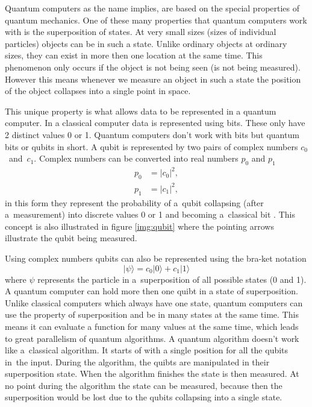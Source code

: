 Quantum computers as the name implies, are based on the special properties of quantum mechanics. One of these many properties that quantum computers work with is the superposition of states. At very small sizes (sizes of individual particles) objects can be in such a state. Unlike ordinary objects at ordinary sizes, they can exist in more then one location at the same time. This phenomenon only occurs if the object is not being seen (is not being measured). However this means whenever we measure an object in such a state the position of the object collapses into a single point in space. \cite{Yanofsky2008}


This unique property is what allows data to be represented in a quantum computer. In a classical computer data is represented using bits. These only have 2 distinct values 0 or 1. Quantum computers don't work with bits but quantum bits or qubits in short. A qubit is represented by two pairs of complex numbers $c_0$~and~$c_1$. Complex numbers can be converted into real numbers $p_0$ and $p_1$
\begin{equation}
  \begin{aligned}
    p_0 &= \lvert c_0 \rvert^2, \\
    p_1 &= \lvert c_1 \rvert^2,
  \end{aligned}  
\end{equation}
in this form they represent the probability of a~qubit collapsing (after a~measurement) into discrete values 0 or 1 and becoming a~classical bit \cite{Yanofsky2008}. This concept is also illustrated in figure \ref{img:qubit} where the pointing arrows illustrate the qubit being measured.

Using complex numbers qubits can also be represented using the bra-ket notation
\begin{equation}
  \lvert\psi\rangle=c_0|0\rangle + c_1|1\rangle
\end{equation}
where $\psi$ represents the particle in a~superposition of all possible states (0 and 1). A quantum computer can hold more then one quibt in a state of superposition. Unlike classical computers which always have one state, quantum computers can use the property of superposition and be in many states at the same time. This means it can evaluate a function for many values at the same time, which leads to great parallelism of quantum algorithms. A quantum algorithm doesn't work like a~classical algorithm. It starts of with a single position for all the qubits in~the input. During the algorithm, the quibts are manipulated in their superposition state. When the algorithm finishes the state is then measured. At no point during the algorithm the state can be measured, because then the superposition would be lost due to the qubits collapsing into a single state. \cite{Yanofsky2008} 
